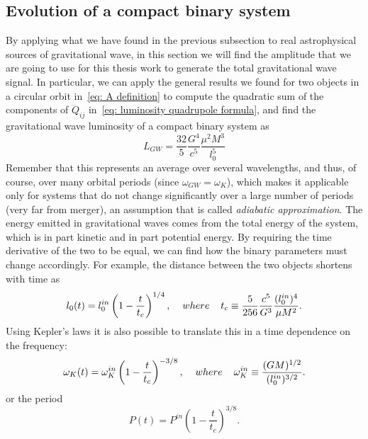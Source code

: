 \subsection{Evolution of a compact binary system}
By applying what we have found in the previous subsection to real astrophysical sources of gravitational wave, in this section we will find the amplitude that we are going to use for this thesis work to generate the total gravitational wave signal.
In particular, we can apply the general results we found for two objects in a circular orbit in~\eqref{eq: A definition} to compute the quadratic sum of the components of $\dddot{Q}_{ij}$ in~\eqref{eq: luminosity quadrupole formula}, and find the gravitational wave luminosity of a compact binary system as
\[
    L_{GW}=\frac{32}{5}\frac{G^4}{c^5}\frac{\mu^2 M^3}{l_0^5}
\]
Remember that this represents an average over several wavelengths, and thus, of course, over many orbital periods (since $\omega_{GW}=\omega_K$), which makes it applicable only for systems that do not change significantly over a large number of periods (very far from merger), an assumption that is called \textit{adiabatic approximation}.
The energy emitted in gravitational waves comes from the total energy of the system, which is in part kinetic and in part potential energy. 
By requiring the time derivative of the two to be equal, we can find how the binary parameters must change accordingly. 
For example, the distance between the two objects shortens with time as
\begin{equation}
    l_0(t) = l_0^{in}\left(1-\frac{t}{t_c}\right)^{1/4},\hspace{4mm} where\hspace{4mm}    t_c\equiv \frac{5}{256}\frac{c^5}{G^3}\frac{(l_0^{in})^4}{\mu M^2}.
    \label{eq: l_0 time variation}
\end{equation}
Using Kepler's laws it is also possible to translate this in a time dependence on the frequency:
\begin{equation}
    \omega_K(t) = \omega_K^{in}\left(1-\frac{t}{t_c}\right)^{-3/8}, \hspace{4mm} where\hspace{4mm}\omega_K^{in} \equiv \frac{(GM)^{1/2}}{(l_0^{in})^{3/2}}.
    \label{eq: omega_K time variation}
\end{equation}
or the period
\begin{equation}
    P(t) = P^{in}\left(1-\frac{t}{t_c}\right)^{3/8}.
    \label{eq: P time variation}
\end{equation}

